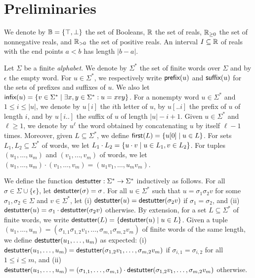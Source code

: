 \section{Preliminaries} \label{sec:preliminaries}

%
We denote by $\mathbb{B} = \{ \top, \bot \}$ the set of Booleans, $\mathbb{R}$ the set of reals, $\mathbb{R}_{\geq 0}$ the set of nonnegative reals, and $\mathbb{R}_{> 0}$ the 
set of positive reals.
%
An interval $I \subseteq \mathbb{R}$ of reals with the end points $a < b$ has length $|b-a|$.

Let $\Sigma$ be a finite {\em alphabet}.
%
We denote by $\Sigma^*$ the set of finite words over $\Sigma$ and by $\epsilon$ the empty word.
%
For $u \in \Sigma^*$, we respectively write $\textsf{prefix}(u)$ and $\textsf{suffix}(u)$ for the sets of prefixes 
and suffixes of $u$.
%
We also let $\infx(u) = \{v \in \Sigma^* \st \exists x,y \in \Sigma^* : u = xvy\}$.
%
For a nonempty word $u \in \Sigma^*$ and $1 \leq i \leq |u|$, we denote by $u[i]$ the $i$th letter of 
$u$, by $u[..i]$ the prefix of $u$ of length $i$, and by $u[i..]$ the suffix of $u$ of length $|u| - i + 1$. 
%
Given $u \in \Sigma^*$ and $\ell \geq 1$, we denote by $u^\ell$ the word obtained by concatenating $u$ by itself $\ell - 1$ times.
Moreover, given $L \subseteq \Sigma^*$, we define $\first(L) = \{ u[0] \st u \in L\}$.
For sets $L_1, L_2 \subseteq \Sigma^*$ of words, we let $L_1 \cdot L_2 = \{u \cdot v \st u \in L_1, v \in L_2\}$.
For tuples $(u_1, \ldots, u_m)$ and $(v_1, \ldots, v_m)$ of words, we let $(u_1, \ldots, u_m) \cdot (v_1, \ldots, v_m) = (u_1 v_1, \ldots, u_m v_m)$.

We define the function $\mathsf{destutter} : \Sigma^* \to \Sigma^*$ inductively as follows.
For all $\sigma \in \Sigma \cup \{\epsilon\}$, let $\mathsf{destutter}(\sigma) = \sigma$.
%
For all $u \in \Sigma^*$ such that $u = \sigma_1 \sigma_2 v$ for some $\sigma_1,\sigma_2 \in 
\Sigma$ and $v \in \Sigma^*$, let (i) $\mathsf{destutter}(u) = \mathsf{destutter}(\sigma_2 v)$ if $\sigma_1 = 
\sigma_2$, and (ii) $\mathsf{destutter}(u) = \sigma_1 \cdot \mathsf{destutter}(\sigma_2 v)$ otherwise.
%
By extension, for a set $L \subseteq \Sigma^*$ of finite words, we write $\destutter(L) = 
\{\destutter(u) \st u \in L\}$.
%
Given a tuple $(u_1, \ldots, u_m) = (\sigma_{1,1} \sigma_{1,2} v_1, \ldots, \sigma_{m,1} \sigma_{m,2} v_m)$ of finite words of the same length, we define $\mathsf{destutter}(u_1, \ldots, u_m)$ as expected: (i) $\mathsf{destutter}(u_1, \ldots, u_m) = \mathsf{destutter}(\sigma_{1,2} v_1, \ldots, \sigma_{m,2} v_m)$ if $\sigma_{i,1} = 
\sigma_{i,2}$ for all $1 \leq i \leq m$, and (ii) $\mathsf{destutter}(u_1, \ldots, u_m) = (\sigma_{1,1}, \ldots, \sigma_{m,1}) \cdot \mathsf{destutter}(\sigma_{1,2} v_1, \ldots, \sigma_{m,2} v_m)$ otherwise.


